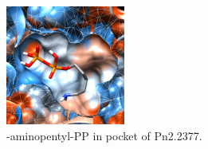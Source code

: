 \documentclass[12pt]{article}
\begin{document}
	\FloatBarrier
	
	
	\FloatBarrier
	\begin{figure}[h!]
		\centering
		\includegraphics[width=0.35\textwidth]{../9/Dock/chimera.png}
		\caption{-aminopentyl-PP in pocket of Pn2.2377.}
		\label{fig9_4}
	\end{figure}
	\FloatBarrier

	\newpage
	
	
	
	
	\newpage
	\tableofcontents
	\listoffigures
	\listoftables
	
\end{document}
